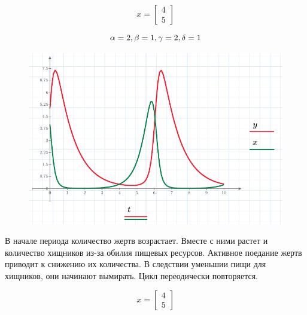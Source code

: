 \documentclass[a4paper, 14pt]{extarticle}
\begin{document}
		\noindent \[ x = \begin{bmatrix}
			4 \\ 5
		\end{bmatrix} \]
	
		\noindent\[
			\alpha = 2,\\
			\beta = 1,\\
			\gamma = 2,\\
			\delta = 1
		\]
		\begin{figure}[H]
			\centering
			\includegraphics[width = \linewidth]{3.pdf}
			\caption[.] {}
		\end{figure}
		В начале периода количество жертв возрастает. Вместе с ними растет и количество хищников из-за обилия
		пищевых ресурсов. Активное поедание жертв приводит к снижению их количества. В следствии уменьшии пищи для хищников, они начинают вымирать. Цикл переодически повторяется.
		\pagebreak
		
		\noindent \[ x = \begin{bmatrix}
			4 \\ 5
		\end{bmatrix} \]
		
\end{document}
